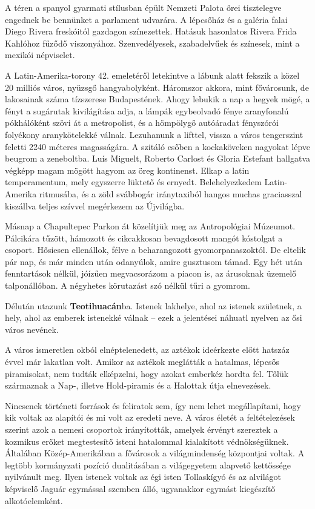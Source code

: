 A téren a spanyol gyarmati stílusban épült Nemzeti Palota őrei
tisztelegve engednek be bennünket a parlament udvarára. A lépcsőház
és a galéria falai Diego Rivera freskóitól gazdagon színezettek.
Hatásuk hasonlatos Rivera Frida Kahlóhoz fűződő viszonyához.
Szenvedélyesek, szabadelvűek és színesek, mint a mexikói népviselet.

A Latin-Amerika-torony 42. emeletéről letekintve a lábunk alatt
fekszik a közel 20 milliós város, nyüzsgő hangyabolyként. Háromszor
akkora, mint fővárosunk, de lakosainak száma tízszerese Budapestének.
Ahogy lebukik a nap a hegyek mögé, a fényt a sugárutak kivilágítása
adja, a lámpák egybeolvadó fénye aranyfonalú pókhálóként szövi át a
metropolist, és a hömpölygő autóáradat fényszórói folyékony aranykötelekké
válnak. Lezuhanunk a lifttel, vissza a város tengerszint feletti 2240
méteres magasságára. A szitáló esőben a kockaköveken nagyokat lépve
beugrom a zeneboltba. Luís Miguelt, Roberto Carlost és Gloria Estefant
hallgatva végképp magam mögött hagyom az öreg kontinenst. Elkap a
latin temperamentum, mely egyszerre lüktető és ernyedt. Belehelyezkedem
Latin-Amerika ritmusába, és a zöld svábbogár iránytaxiból hangos
muchas graciasszal kiszállva teljes szívvel megérkezem az Újvilágba.

Másnap a Chapultepec Parkon át közelítjük meg az Antropológiai
Múzeumot. Pálcikára tűzött, hámozott és cikcakkosan bevagdosott
mangót kóstolgat a csoport. Hősiesen ellenállok, félve a beharangozott
gyomorpanaszoktól. De eltelik pár nap, és már minden után odanyúlok,
amire gusztusom támad. Egy hét után fenntartások nélkül, jóízűen
megvacsorázom a piacon is, az árusoknak üzemelő talponállóban.
A négyhetes körutazást szó nélkül tűri a gyomrom.

Délután utazunk \textbf{Teotihuacán}ba. Istenek lakhelye, ahol az istenek
születnek, a hely, ahol az emberek istenekké válnak -- ezek a jelentései
náhuatl nyelven az ősi város nevének.

A város ismeretlen okból elnéptelenedett, az aztékok ideérkezte
előtt hatszáz évvel már lakatlan volt. Amikor az aztékok meglátták
a hatalmas, lépcsős piramisokat, nem tudták elképzelni, hogy azokat
emberkéz hordta fel. Tőlük származnak a Nap-, illetve Hold-piramis
és a Halottak útja elnevezések.

Nincsenek történeti források és feliratok sem, így nem lehet megállapítani,
hogy kik voltak az alapítói és mi volt az eredeti neve. A város
életét a feltételezések szerint azok a nemesi csoportok irányították,
amelyek érvényt szereztek a kozmikus erőket megtestesítő isteni hatalommal
kialakított védnökségüknek. Általában Közép-Amerikában a
fővárosok a világmindenség központjai voltak. A legtöbb kormányzati
pozíció dualitásában a világegyetem alapvető kettőssége nyilvánult
meg. Ilyen istenek voltak az égi isten Tollaskígyó és az alvilágot
képviselő Jaguár egymással szemben álló, ugyanakkor egymást kiegészítő
alkotóelemként.

